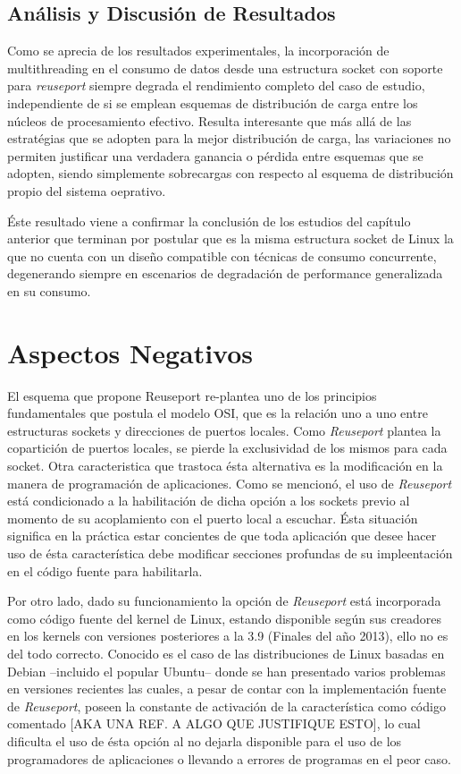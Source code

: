 \subsection{Análisis y Discusión de Resultados}
Como se aprecia de los resultados experimentales, la incorporación de multithreading en el consumo de datos desde una estructura socket con soporte para \emph{reuseport} siempre degrada el rendimiento completo del caso de estudio, independiente de si se emplean esquemas de distribución de carga entre los núcleos de procesamiento efectivo. Resulta interesante que más allá de las estratégias que se adopten para la mejor distribución de carga, las variaciones no permiten justificar una verdadera ganancia o pérdida entre esquemas que se adopten, siendo simplemente sobrecargas con respecto al esquema de distribución propio del sistema oeprativo.

Éste resultado viene a confirmar la conclusión de los estudios del capítulo anterior que terminan por postular que es la misma estructura socket de Linux la que no cuenta con un diseño compatible con técnicas de consumo concurrente, degenerando siempre en escenarios de degradación de performance generalizada en su consumo.

\section{Aspectos Negativos}

El esquema que propone Reuseport re-plantea uno de los principios fundamentales que postula el modelo OSI, que es la relación uno a uno entre estructuras sockets y direcciones de puertos locales. Como \emph{Reuseport} plantea la copartición de puertos locales, se pierde la exclusividad de los mismos para cada socket. Otra caracteristica que trastoca ésta alternativa es la modificación en la manera de programación de aplicaciones. Como se mencionó, el uso de \emph{Reuseport} está condicionado a la habilitación de dicha opción a los sockets previo al momento de su acoplamiento con el puerto local a escuchar. Ésta situación significa en la práctica estar concientes de que toda aplicación que desee hacer uso de ésta característica debe modificar secciones profundas de su impleentación en el código fuente para habilitarla.

Por otro lado, dado su funcionamiento la opción de \emph{Reuseport} está incorporada como código fuente del kernel de Linux, estando disponible según sus creadores en los kernels con versiones posteriores a la 3.9 (Finales del año 2013), ello no es del todo correcto. Conocido es el caso de las distribuciones de Linux basadas en Debian --incluido el popular Ubuntu-- donde se han presentado varios problemas en versiones recientes las cuales, a pesar de contar con la implementación fuente de \emph{Reuseport}, poseen la constante de activación de la característica como código comentado [AKA UNA REF. A ALGO QUE JUSTIFIQUE ESTO], lo cual dificulta el uso de ésta opción al no dejarla disponible para el uso de los programadores de aplicaciones o llevando a errores de programas en el peor caso.

